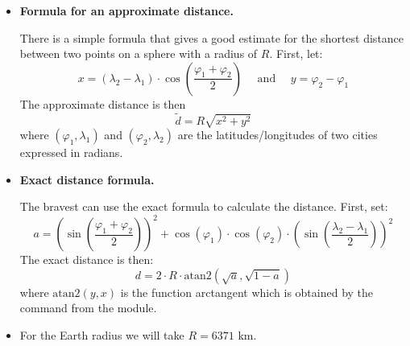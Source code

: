\documentclass[11pt,class=report,crop=false]{standalone}
\begin{document}
\begin{activite}
\begin{enumerate}
\begin{itemize}
	\item \textbf{Formula for an approximate distance.}
	
	There is a simple formula that gives a good estimate for the shortest distance between two points on a sphere with a radius of $R$.
    First, let:
    $$x =   (\lambda_2-\lambda_1)\cdot  \cos\left( \frac{\varphi_1+\varphi_2}{2} \right)
    \quad\text{ and }\quad 
    y = \varphi_2-\varphi_1$$
	The approximate distance is then 
	$$ \tilde d = R \sqrt{x^2 + y^2}$$		
	where $(\varphi_1,\lambda_1)$ and $(\varphi_2,\lambda_2)$ are the latitudes/longitudes of two cities expressed in radians.
	
	\item \textbf{Exact distance formula.}
	
	The bravest can use the exact formula to calculate the distance.
	First, set: 
	$$a = \left(\sin\left(\frac{\varphi_1+\varphi_2}{2}\right)\right)^2 + \cos(\varphi_1)\cdot \cos(\varphi_2) \cdot \left(\sin\left( \frac{\lambda_2-\lambda_1}{2} \right)\right)^2$$
    The exact distance is then:
    $$d = 2 \cdot R \cdot \text{atan2}\left(\sqrt{a},\sqrt{1-a}\right)$$
    where $\text{atan2}(y,x)$ is the function \og{}arctangent\fg{} which is obtained by the  command from the  module.	
	
	\item For the Earth radius we will take $R = 6371$ km.

\end{itemize}
  
\end{enumerate}   
     
\end{activite}
\end{document}
